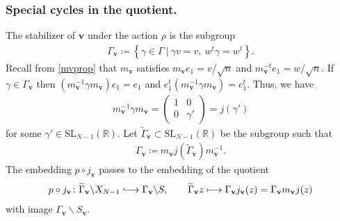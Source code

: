 \documentclass[a4paper,11pt]{amsart} %
\newcommand{\8}{\infty}
\newcommand{\vbf}{\mathbf{v}}
\newcommand{\SL}{\mathrm{SL}}
\newcommand{\Gamtil}{\widetilde{\Gamma}}
\newcommand{\R}{\mathbb{R}}
\newcommand{\hooklongrightarrow}{\lhook\joinrel\longrightarrow}
\theoremstyle{mytheoremstyle}
\theoremstyle{remark}
\numberwithin{equation}{section}
\begin{document}
\subsubsection{Special cycles in the quotient.} The stabilizer of $\vbf$ under the action $\rho$ is the subgroup
\begin{align}
   \Gamma_\vbf \coloneqq \left \{ \left . \gamma  \in \Gamma \ \right \vert \ \gamma v=v, \ w^t \gamma=w^t\right \}.  
 \end{align}
Recall from \eqref{mvprop} that $m_\vbf$ satisfies $m_\vbf e_1= v/\sqrt{n}$ and $m_\vbf^{-t}e_1=w/\sqrt{n}$. If $\gamma \in \Gamma_\vbf$ then $(m_\vbf^{-1} \gamma m_\vbf)e_1=e_1$ and $e_1^t(m_\vbf^{-1} \gamma m_\vbf)=e_1^t$. Thus, we have
\begin{align}
    m_\vbf^{-1} \gamma m_\vbf=\begin{pmatrix}
        1 & 0 \\ 0 & \gamma'
    \end{pmatrix}=j(\gamma')
\end{align}
for some $\gamma' \in \SL_{N-1}(\R)$. Let $\Gamtil_\vbf \subset \SL_{N-1}(\R)$ be the subgroup such that
\begin{align}
\Gamma_\vbf \coloneqq m_\vbf j(\Gamtil_\vbf)m_\vbf^{-1}.
\end{align}
The embedding $p \circ j_\vbf$ passes to the embedding of the quotient
 \begin{align} \label{jvembls}
     p \circ j_\vbf \colon \Gamtil_\vbf \backslash X_{N-1} \hooklongrightarrow \Gamma_{\vbf} \backslash S, \qquad
     \Gamtil_\vbf z \longmapsto \Gamma_\vbf j_\vbf(z)=\Gamma_\vbf m_\vbf j(z)
 \end{align}
 with image $\Gamma_{\vbf} \backslash S_\vbf$. 
\end{document}

